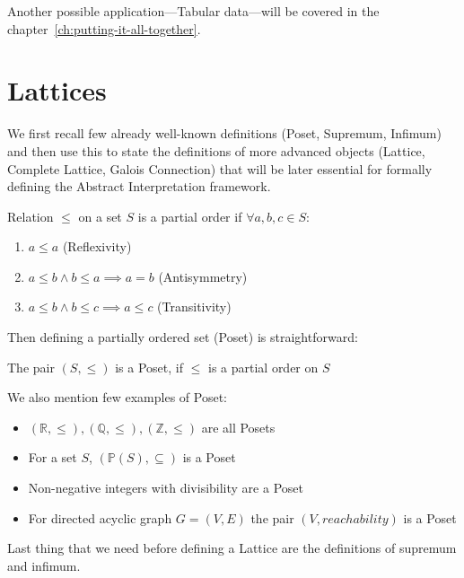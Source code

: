 Another possible application---Tabular data---will be covered in the chapter~\ref{ch:putting-it-all-together}.


\section{Lattices} %

We first recall few already well-known definitions (Poset, Supremum, Infimum) and then use this
to state the definitions of more advanced objects (Lattice, Complete Lattice, Galois Connection) that will be later
essential for formally defining the Abstract Interpretation framework.

\begin{defn}
    Relation $\leq$ on a set $S$ is a partial order if $\forall a, b, c \in S$:
    \begin{enumerate}
        \item $a \leq a$ (Reflexivity)
        \item $a \leq b \land b \leq a \implies a = b$ (Antisymmetry)
        \item $a \leq b \land b \leq c \implies a \leq c$ (Transitivity)
    \end{enumerate}
\end{defn}

Then defining a partially ordered set (Poset) is straightforward:

\begin{defn}[Poset]
    The pair $(S, \leq)$ is a Poset, if $\leq$ is a partial order on $S$
\end{defn}

\begin{example}
    We also mention few examples of Poset:
    \begin{itemize}
        \item $(\mathbb{R}, \leq), (\mathbb{Q}, \leq), (\mathbb{Z}, \leq)$ are all Posets
        \item For a set $S$, $(\mathbb{P}(S), \subseteq)$ is a Poset
        \item Non-negative integers with divisibility are a Poset
        \item For directed acyclic graph $G=(V,E)$ the pair $(V, reachability)$ is a Poset
    \end{itemize}
\end{example}

Last thing that we need before defining a Lattice are the definitions of supremum and infimum.


